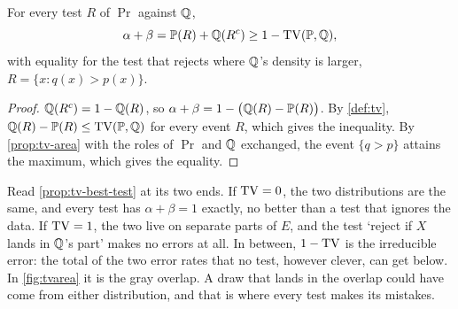 \begin{proposition}
\label{prop:tv-best-test}
For every test $R$ of $\Pr$ against $\mathbb{Q}$,
\[
\alpha + \beta = \mathbb{P}(R) + \mathbb{Q}(R^c) \geq 1 - \mathrm{TV}(\mathbb{P}, \mathbb{Q}),
\]
with equality for the test that rejects where $\mathbb{Q}$'s density is larger, $R = \{x : q(x) > p(x)\}$.
\end{proposition}

\begin{proof}
$\mathbb{Q}(R^c) = 1 - \mathbb{Q}(R)$, so $\alpha + \beta = 1 - \big(\mathbb{Q}(R) - \mathbb{P}(R)\big)$.
By \cref{def:tv}, $\mathbb{Q}(R) - \mathbb{P}(R) \leq \mathrm{TV}(\mathbb{P}, \mathbb{Q})$ for every event $R$, which gives the inequality.
By \cref{prop:tv-area} with the roles of $\Pr$ and $\mathbb{Q}$ exchanged, the event $\{q > p\}$ attains the maximum, which gives the equality.
\end{proof}

\begin{intuition}
Read \cref{prop:tv-best-test} at its two ends.
If $\mathrm{TV} = 0$, the two distributions are the same, and every test has $\alpha + \beta = 1$ exactly, no better than a test that ignores the data.
If $\mathrm{TV} = 1$, the two live on separate parts of $E$, and the test `reject if $X$ lands in $\mathbb{Q}$'s part' makes no errors at all.
In between, $1 - \mathrm{TV}$ is the irreducible error: the total of the two error rates that no test, however clever, can get below.
In \cref{fig:tvarea} it is the gray overlap.
A draw that lands in the overlap could have come from either distribution, and that is where every test makes its mistakes.
\end{intuition}

